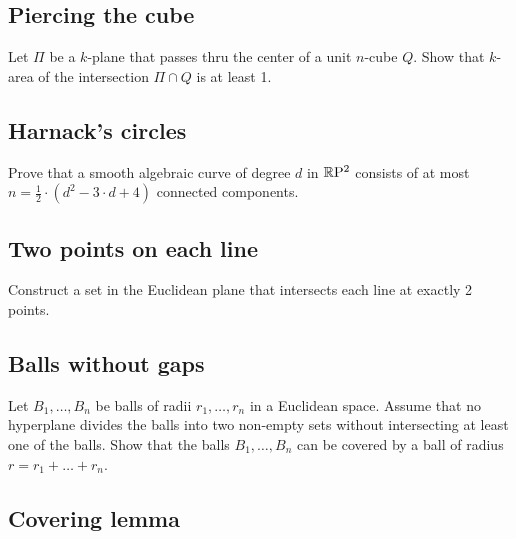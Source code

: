 \subsection*{Piercing the cube}\label{Piercing the cube}

\begin{pr}
Let $\Pi$ be a $k$-plane that passes thru the center of a unit $n$-cube $Q$.
Show that $k$-area of the intersection $\Pi\cap Q$ is at least 1.
\end{pr}


\subsection*{Harnack's circles}\label{Harnack}

\begin{pr}
Prove that a smooth algebraic curve of degree $d$ in $\mathbb{R}\mathrm{P}^2$ consists of at most $n=\tfrac12\cdot(d^2-3\cdot d+4)$ connected components.
\end{pr}

\subsection*{Two points on each line}\label{2pts-on-line}

\begin{pr}
Construct a set in the Euclidean plane that intersects each line at exactly 2 points. 
\end{pr}

\subsection*{Balls without gaps}
\label{Balls without gaps}

\begin{pr}
Let $B_1,\ldots,B_n$ be balls
of radii $r_1,\ldots,r_n$
in a Euclidean space.
Assume that no hyperplane divides the balls into two
non-empty sets without intersecting at least one of the balls. 
Show that the balls
$B_1,\ldots,B_n$ can be covered by a ball of radius
$r=r_1+\ldots+r_n$.

\end{pr}

\subsection*{Covering lemma}


